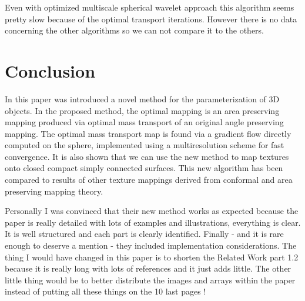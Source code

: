 \documentclass[11pt,a4paper]{article}
\begin{document}
\vskip 0.5cm
Even with optimized multiscale spherical wavelet approach this algorithm seems pretty slow because of the optimal transport iterations. However there is no data concerning the other algorithms so we can not compare it to the others. 

\section{Conclusion}

In this paper was introduced a novel method for the parameterization of 3D objects. 
In the proposed method, the optimal mapping is an area preserving mapping produced via optimal mass transport of an original angle preserving mapping. 
The optimal mass transport map is found via a gradient flow directly computed on the sphere, implemented using a multiresolution scheme
for fast convergence. 
It is also shown that we can use the new method to map textures onto closed compact simply connected surfaces.
This new algorithm has been compared to results of other texture mappings derived from conformal and area preserving mapping theory.

\vskip 0.5cm
Personally I was convinced that their new method works as expected because the paper is really detailed with lots of examples and illustrations, everything is clear.
It is well structured and each part is clearly identified. Finally - and it is rare enough to deserve a mention - they included implementation considerations.
The thing I would have changed in this paper is to shorten the Related Work part 1.2 because it is really long with lots of references and it just adds little. The other little thing would be to better distribute the images and arrays within the paper instead of putting all these things on the 10 last pages !



\end{document}
